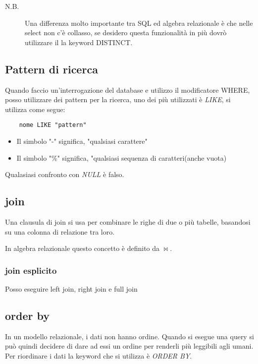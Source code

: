 \begin{description}
	\item[N.B.] Una differenza molto importante tra SQL ed algebra relazionale è che nelle select non c'è collasso, se desidero questa funzionalità in più dovrò utilizzare il la keyword DISTINCT.
 \end{description}

\subsection{Pattern di ricerca}
Quando faccio un'interrogazione del database e utilizzo il modificatore WHERE, posso utilizzare dei pattern per la ricerca, uno dei più utilizzati è \textit{LIKE}, si utilizza come segue:

\begin{lstlisting}
    nome LIKE "pattern"
\end{lstlisting}

\begin{itemize}
    \item Il simbolo "-" significa, "qualsiasi carattere"
    \item Il simbolo "\%" significa, "qualsiasi sequenza di caratteri(anche vuota)
\end{itemize}

Qualasiasi confronto con \textit{NULL} è falso.

\subsection{join}

Una clausula di join si usa per combinare le righe di due o più tabelle, basandosi su una colonna di relazione tra loro.

In algebra relazionale questo concetto è definito da $\bowtie$.


\subsubsection{join esplicito}

Posso eseguire left join, right join e full join

\subsection{order by}

In un modello relazionale, i dati non hanno ordine. Quando si esegue una query si può quindi decidere di dare ad essi un ordine per renderli più leggibili agli umani. Per riordinare i dati la keyword che si utilizza è \textit{ORDER BY}.

